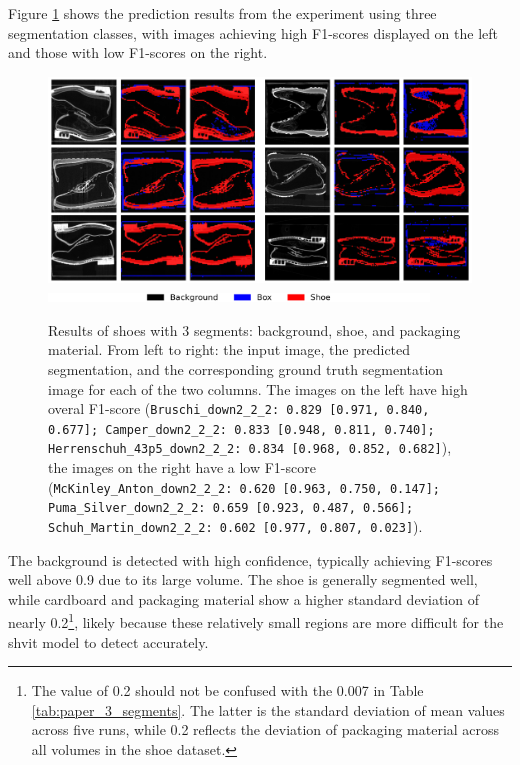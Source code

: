 \medskip 

Figure \ref{Paper_3Segments} shows the prediction results from the experiment using three segmentation classes, with images achieving high F1-scores displayed on the left and those with low F1-scores on the right.

\begin{figure}[H]
	\centering
	\includegraphics[width=1.0\textwidth]{./images/Paper_3Segments.png}
	\includegraphics[width=0.9\textwidth]{./images/color_legend_3_classes.png}
	\caption[Results of shoes with 3 segments: background, shoe, and packaging material]{Results of shoes with 3 segments: background, shoe, and packaging material. From left to right: the input image, the predicted segmentation, and the corresponding ground truth segmentation image for each of the two columns. The images on the left have high overal F1-score ({\tt \small Bruschi\_down2\_2\_2: 0.829 [0.971, 0.840, 0.677]\footnotemark; Camper\_down2\_2\_2: 0.833 [0.948, 0.811, 0.740]; Herrenschuh\_43p5\_down2\_2\_2: 0.834 [0.968, 0.852, 0.682]}), the images on the right have a low F1-score ({\tt \small McKinley\_Anton\_down2\_2\_2: 0.620 [0.963, 0.750, 0.147]; Puma\_Silver\_down2\_2\_2: 0.659 [0.923, 0.487, 0.566]; Schuh\_Martin\_down2\_2\_2: 0.602 [0.977, 0.807, 0.023]}).}
	\label{Paper_3Segments}
\end{figure}

The background is detected with high confidence, typically achieving F1-scores well above 0.9 due to its large volume. The shoe is generally segmented well, while cardboard and packaging material show a higher standard deviation of nearly 0.2\footnote{The value of 0.2 should not be confused with the 0.007 in Table \ref{tab:paper_3_segments}. The latter is the standard deviation of mean values across five runs, while 0.2 reflects the deviation of packaging material across all volumes in the shoe dataset.}, likely because these relatively small regions are more difficult for the \gls{shvit} model to detect accurately.

